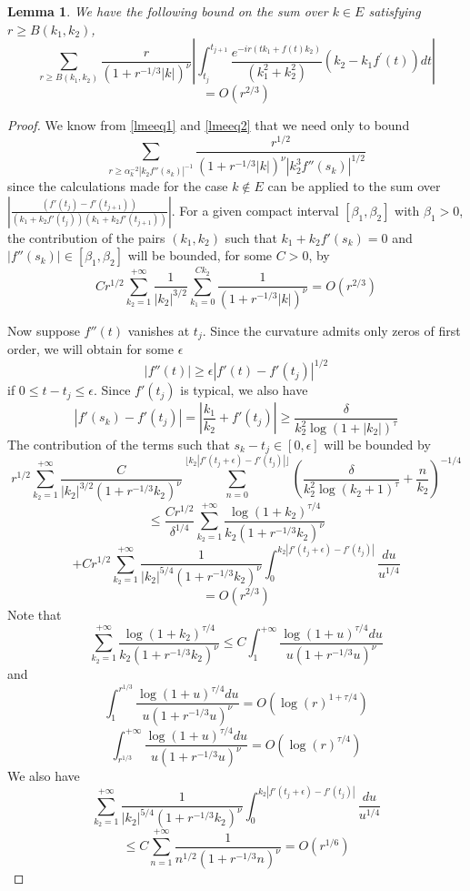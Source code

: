 \documentclass[12pt]{amsart}
\numberwithin{equation}{subsection}
\theoremstyle{definition}
\theoremstyle{plain}
\newtheorem{lemma}[equation]{Lemma}
\begin{document}
\begin{lemma}
\label{lemma2}
We have the following bound on the sum over $k \in E$ satisfying $r \geq B(k_1,k_2)$,
\[
\sum_{r \geq B(k_1,k_2)} \frac{r}{(1+r^{-1/3}|k|)^\nu}
\left| \int_{t_j}^{t_{j+1}}
\frac{e^{-ir(t k_1 + f(t) k_2)}}{(k_1^2 + k_2^2)}(k_2 - k_1 f^{'}(t)) dt \right|
\]
\[
= O(r^{2/3})
\]
\end{lemma}
\begin{proof}
We know from \eqref{lmeeq1} and \eqref{lmeeq2} that we need only to bound
\[
\sum_{r \geq \alpha_k^{-2} |k_2 f''(s_k)|^{-1}} \frac{r^{1/2}}{(1+r^{-1/3}|k|)^\nu |k_2^3 f''(s_k)|^{1/2}}
\]
since the calculations made for the case $k \notin E$ can be applied to the sum over $\left| \frac{(f'(t_{j})-f'(t_{j+1}))}{(k_1+k_2 f'(t_{j}))(k_1+k_2 f'(t_{j+1}))} \right|$.
For a given compact interval $[\beta_1,\beta_2]$ with $\beta_1 > 0$, the contribution of the pairs $(k_1,k_2)$ such that $k_1+k_2 f'(s_k) = 0$ and
$|f''(s_k)| \in [\beta_1,\beta_2]$ will be bounded, for some $C > 0$, by
\[
C r^{1/2} \sum_{k_2=1}^{+\infty} \frac{1}{|k_2|^{3/2}} \sum_{k_1=0}^{ C k_2 } \frac{1}{(1+r^{-1/3}|k|)^\nu} = O(r^{2/3})
\]

Now suppose $f''(t)$ vanishes at $t_j$.
Since the curvature admits only zeros of first order, we will obtain for some $\epsilon$
\[
|f''(t)| \geq \epsilon |f'(t)-f'(t_j)|^{1/2}
\]
if $0 \leq t-t_j \leq \epsilon$.
Since $f'(t_j)$ is typical, we also have
\[
\left| f'(s_k) - f'(t_j) \right| =
\left| \frac{k_1}{k_2} + f'(t_j) \right| \geq \frac{\delta}{k_2^{2} \log(1+|k_2|)^{\tau}}
\]
The contribution of the terms such that $s_k - t_j \in [0,\epsilon]$ will be
bounded by
\[
r^{1/2} \sum_{k_2 = 1}^{+\infty} \frac{C}{|k_2|^{3/2}(1+r^{-1/3}k_2)^\nu} \sum_{n=0}^{\lfloor k_2 |f'(t_j+\epsilon) - f'(t_j)| \rfloor}
\left( \frac{\delta}{k_2^{2} \log(k_2 +1)^{\tau}}+\frac{n}{k_2} \right)^{-1/4}
\]
\[
\leq \frac{C r^{1/2}}{\delta^{1/4}} \sum_{k_2 = 1}^{+\infty} \frac{\log(1+k_2)^{\tau/4}}{k_2(1+r^{-1/3}k_2)^\nu}
\]
\[
+C r^{1/2} \sum_{k_2 = 1}^{+\infty} \frac{1}{|k_2|^{5/4}(1+r^{-1/3}k_2)^\nu}
\int_{0}^{k_2|f'(t_j+\epsilon) - f'(t_j)|} \frac{du}{u^{1/4}}
\]
\[
= O(r^{2/3})
\]
Note that
\[
\sum_{k_2 = 1}^{+\infty} \frac{\log(1+k_2)^{\tau/4}}{k_2(1+r^{-1/3}k_2)^\nu}
\leq C \int_1^{+\infty} \frac{\log (1+u)^{\tau/4} du}{u(1+r^{-1/3}u)^\nu}
\]
and
\[
\int_1^{r^{1/3}} \frac{\log (1+u)^{\tau/4} du}{u(1+r^{-1/3}u)^\nu} = O(\log(r)^{1+\tau/4})
\]
\[
\int_{r^{1/3}}^{+\infty} \frac{\log (1+u)^{\tau/4} du}{u(1+r^{-1/3}u)^\nu} = O(\log(r)^{\tau/4})
\]
We also have
\[
\sum_{k_2 = 1}^{+\infty} \frac{1}{|k_2|^{5/4}(1+r^{-1/3}k_2)^\nu}
\int_{0}^{k_2|f'(t_j+\epsilon) - f'(t_j)|} \frac{du}{u^{1/4}}
\]
\[
\leq C \sum_{n = 1}^{+\infty} \frac{1}{n^{1/2}(1+r^{-1/3}n)^\nu} = O(r^{1/6})
\]


\end{proof}
\end{document}
